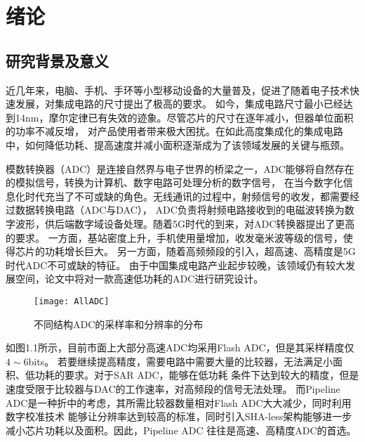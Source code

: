 \newpage

\section{绪论}

\subsection{研究背景及意义}
    近几年来，电脑、手机、手环等小型移动设备的大量普及，促进了随着电子技术快速发展，对集成电路的尺寸提出了极高的要求。
    如今，集成电路尺寸最小已经达到14nm，摩尔定律已有失效的迹象。尽管芯片的尺寸在逐年减小，但器单位面积的功率不减反增，
    对产品使用者带来极大困扰。在如此高度集成化的集成电路中，如何降低功耗、提高速度并减小面积逐渐成为了该领域发展的关键与瓶颈。
    \par 模数转换器（ADC）是连接自然界与电子世界的桥梁之一，ADC能够将自然存在的模拟信号，转换为计算机、数字电路可处理分析的数字信号，
    在当今数字化信息化时代充当了不可或缺的角色。无线通讯的过程中，射频信号的收发，都需要经过数据转换电路（ADC与DAC），
    ADC负责将射频电路接收到的电磁波转换为数字波形，供后端数字域设备处理。随着5G时代的到来，对ADC转换器提出了更高的要求。
    一方面，基站密度上升，手机使用量增加，收发毫米波等级的信号，使得芯片的功耗增长巨大。
    另一方面，随着高频频段的引入，超高速、高精度是5G时代ADC不可或缺的特征。
    由于中国集成电路产业起步较晚，该领域仍有较大发展空间，论文中将对一款高速低功耗的ADC进行研究设计。
    \begin{figure}[ht]
        \centering
        \texttt{[image: AllADC]}
        \caption{\label{fig:alladc}不同结构ADC的采样率和分辨率的分布}
    \end{figure}
    \par 如图1.1所示，目前市面上大部分高速ADC均采用Flash ADC，但是其采样精度仅$ 4\sim 6 $bits。
    若要继续提高精度，需要电路中需要大量的比较器，无法满足小面积、低功耗的要求。对于SAR ADC，能够在低功耗
    条件下达到较大的精度，但是速度受限于比较器与DAC的工作速率，对高频段的信号无法处理。
    而Pipeline ADC是一种折中的考虑，其所需比较器数量相对Flash ADC大大减少，同时利用数字校准技术
    能够让分辨率达到较高的标准，同时引入SHA-less架构能够进一步减小芯片功耗以及面积。因此，Pipeline ADC
    往往是高速、高精度ADC的首选。

